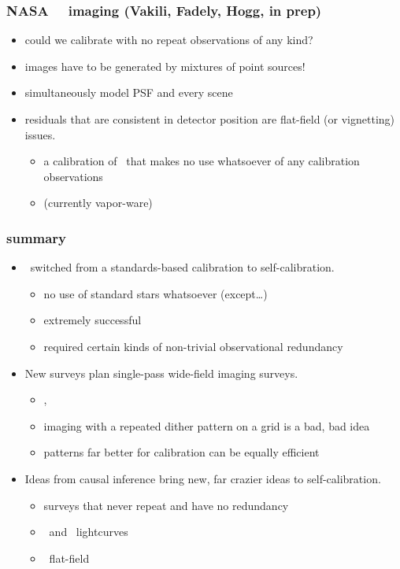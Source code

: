 \documentclass[pdftex]{beamer}
\newcommand{\conclusions}{%
\begin{frame}
  \frametitle{summary}
  \begin{itemize}
  \item \sdss\ switched from a standards-based calibration to self-calibration.
    \begin{itemize}
    \item no use of standard stars whatsoever (except\ldots)
    \item extremely successful
    \item required certain kinds of non-trivial observational redundancy
    \end{itemize}
  \item New surveys plan single-pass wide-field imaging surveys.
    \begin{itemize}
    \item \euclid, \wfirst
    \item imaging with a repeated dither pattern on a grid is a bad, bad idea
    \item patterns far better for calibration can be equally efficient
    \end{itemize}
  \item Ideas from causal inference bring new, far crazier ideas to self-calibration.
    \begin{itemize}
    \item surveys that never repeat and have no redundancy
    \item \kepler\ and \kt\ lightcurves
    \item \wfc\ flat-field
    \end{itemize}
  \end{itemize}
\end{frame}}
\begin{document}
\begin{frame}
  \frametitle{NASA \hst\ \wfc\ imaging {\small (Vakili, Fadely, Hogg, in prep)}}
  \begin{itemize}
  \item could we calibrate with no repeat observations of any kind?
  \item images have to be generated by mixtures of point sources!
  \item simultaneously model PSF and every scene
  \item residuals that are consistent in detector position are flat-field (or vignetting) issues.
    \begin{itemize}
    \item a calibration of \hst\ that makes no use whatsoever of any calibration observations
    \item (currently vapor-ware)
    \end{itemize}
  \end{itemize}
\end{frame}

\conclusions
\end{document}

